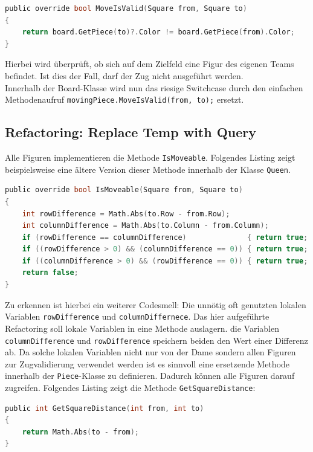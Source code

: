 \documentclass[
10pt, %
a4paper, %
oneside, %
headinclude,footinclude, %
BCOR5mm, %
]{scrartcl}
\begin{document}
\begin{onehalfspace}
\begin{lstlisting}[language=c, style=mStyle]
public override bool MoveIsValid(Square from, Square to)
{
	return board.GetPiece(to)?.Color != board.GetPiece(from).Color;
}
\end{lstlisting}

Hierbei wird überprüft, ob sich auf dem Zielfeld eine Figur des eigenen Teams befindet. Ist dies der Fall, darf der Zug nicht ausgeführt werden.\\
Innerhalb der Board-Klasse wird nun das riesige Switchcase durch den einfachen Methodenaufruf \texttt{movingPiece.MoveIsValid(from, to);} ersetzt.

\subsection{Refactoring: Replace Temp with Query}
\label{sec:replTemp}
Alle Figuren implementieren die Methode \texttt{IsMoveable}. Folgendes Listing zeigt beispielsweise eine ältere Version dieser Methode innerhalb der Klasse \texttt{Queen}.


\begin{lstlisting}[language=c, style=mStyle]
public override bool IsMoveable(Square from, Square to)
{
	int rowDifference = Math.Abs(to.Row - from.Row);
	int columnDifference = Math.Abs(to.Column - from.Column);
	if (rowDifference == columnDifference)              { return true; }
	if ((rowDifference > 0) && (columnDifference == 0)) { return true; }
	if ((columnDifference > 0) && (rowDifference == 0)) { return true; }
	return false;
}
\end{lstlisting}
Zu erkennen ist hierbei ein weiterer Codesmell: Die unnötig oft genutzten lokalen Variablen \texttt{rowDifference} und \texttt{columnDiffernece}. Das hier aufgeführte Refactoring soll lokale Variablen in eine Methode auslagern. die Variablen \texttt{columnDifference} und \texttt{rowDifference} speichern beiden den Wert einer Differenz ab. Da solche lokalen Variablen nicht nur von der Dame sondern allen Figuren zur Zugvalidierung verwendet werden ist es sinnvoll eine ersetzende Methode innerhalb der \texttt{Piece}-Klasse zu definieren. Dadurch können alle Figuren darauf zugreifen. Folgendes Listing zeigt die Methode \texttt{GetSquareDistance}:

\begin{lstlisting}[language=c, style=mStyle]
public int GetSquareDistance(int from, int to)
{
	return Math.Abs(to - from);
}
\end{lstlisting}


\end{onehalfspace}
\end{document}

